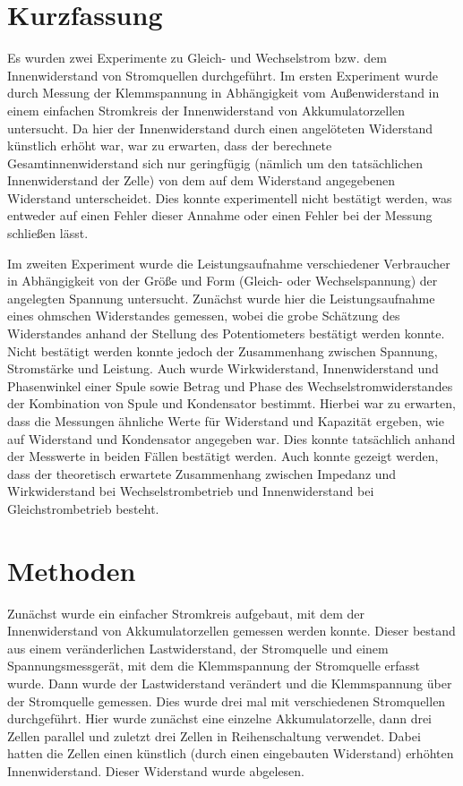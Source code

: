 \documentclass[
	a4paper,
	12pt,
	pagesize,
	ngerman
]{scrartcl}
\begin{document}
	\section{Kurzfassung}
	Es wurden zwei Experimente zu Gleich- und Wechselstrom bzw. dem Innenwiderstand von Stromquellen durchgeführt.
	Im ersten Experiment wurde durch Messung der Klemmspannung in Abhängigkeit vom Außenwiderstand in einem einfachen Stromkreis der Innenwiderstand von Akkumulatorzellen untersucht.
	Da hier der Innenwiderstand durch einen angelöteten Widerstand künstlich erhöht war, war zu erwarten, dass der berechnete Gesamtinnenwiderstand sich nur geringfügig (nämlich um den tatsächlichen Innenwiderstand der Zelle) von dem auf dem Widerstand angegebenen Widerstand unterscheidet.
	Dies konnte experimentell nicht bestätigt werden, was entweder auf einen Fehler dieser Annahme oder einen Fehler bei der Messung schließen lässt.
	\par 
	Im zweiten Experiment wurde die Leistungsaufnahme verschiedener Verbraucher in Abhängigkeit von der Größe und Form (Gleich- oder Wechselspannung) der angelegten Spannung untersucht.
	Zunächst wurde hier die Leistungsaufnahme eines ohmschen Widerstandes gemessen, wobei die grobe Schätzung des Widerstandes anhand der Stellung des Potentiometers bestätigt werden konnte.
	Nicht bestätigt werden konnte jedoch der Zusammenhang zwischen Spannung, Stromstärke und Leistung.
	Auch wurde Wirkwiderstand, Innenwiderstand und Phasenwinkel einer Spule sowie Betrag und Phase des Wechselstromwiderstandes der Kombination von Spule und Kondensator bestimmt.
	Hierbei war zu erwarten, dass die Messungen ähnliche Werte für Widerstand und Kapazität ergeben, wie auf Widerstand und Kondensator angegeben war.
	Dies konnte tatsächlich anhand der Messwerte in beiden Fällen bestätigt werden.
	Auch konnte gezeigt werden, dass der theoretisch erwartete Zusammenhang zwischen Impedanz und Wirkwiderstand bei Wechselstrombetrieb und Innenwiderstand bei Gleichstrombetrieb besteht.
	
	\section{Methoden}
	Zunächst wurde ein einfacher Stromkreis aufgebaut, mit dem der Innenwiderstand von Akkumulatorzellen gemessen werden konnte.
	Dieser bestand aus einem veränderlichen Lastwiderstand, der Stromquelle und einem Spannungsmessgerät, mit dem die Klemmspannung der Stromquelle erfasst wurde.
	Dann wurde der Lastwiderstand verändert und die Klemmspannung über der Stromquelle gemessen.
	Dies wurde drei mal mit verschiedenen Stromquellen durchgeführt.
	Hier wurde zunächst eine einzelne Akkumulatorzelle, dann drei Zellen parallel und zuletzt drei Zellen in Reihenschaltung verwendet.
	Dabei hatten die Zellen einen künstlich (durch einen eingebauten Widerstand) erhöhten Innenwiderstand.
	Dieser Widerstand wurde abgelesen.
	\par
	
\end{document}

